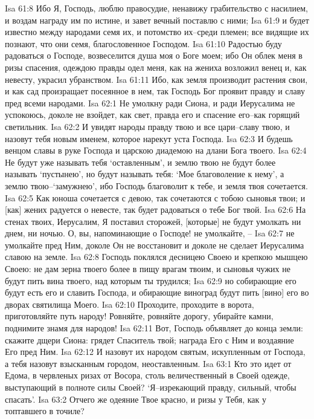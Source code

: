 Isa 61:8  Ибо Я, Господь, люблю правосудие, ненавижу грабительство с насилием, и воздам награду им по истине, и завет вечный поставлю с ними;
Isa 61:9  и будет известно между народами семя их, и потомство их--среди племен; все видящие их познают, что они семя, благословенное Господом.
Isa 61:10  Радостью буду радоваться о Господе, возвеселится душа моя о Боге моем; ибо Он облек меня в ризы спасения, одеждою правды одел меня, как на жениха возложил венец и, как невесту, украсил убранством.
Isa 61:11  Ибо, как земля производит растения свои, и как сад произращает посеянное в нем, так Господь Бог проявит правду и славу пред всеми народами.
Isa 62:1  Не умолкну ради Сиона, и ради Иерусалима не успокоюсь, доколе не взойдет, как свет, правда его и спасение его--как горящий светильник.
Isa 62:2  И увидят народы правду твою и все цари--славу твою, и назовут тебя новым именем, которое нарекут уста Господа.
Isa 62:3  И будешь венцом славы в руке Господа и царскою диадемою на длани Бога твоего.
Isa 62:4  Не будут уже называть тебя `оставленным', и землю твою не будут более называть `пустынею', но будут называть тебя: `Мое благоволение к нему', а землю твою--`замужнею', ибо Господь благоволит к тебе, и земля твоя сочетается.
Isa 62:5  Как юноша сочетается с девою, так сочетаются с тобою сыновья твои; и [как] жених радуется о невесте, так будет радоваться о тебе Бог твой.
Isa 62:6  На стенах твоих, Иерусалим, Я поставил сторожей, [которые] не будут умолкать ни днем, ни ночью. О, вы, напоминающие о Господе! не умолкайте, --
Isa 62:7  не умолкайте пред Ним, доколе Он не восстановит и доколе не сделает Иерусалима славою на земле.
Isa 62:8  Господь поклялся десницею Своею и крепкою мышцею Своею: не дам зерна твоего более в пищу врагам твоим, и сыновья чужих не будут пить вина твоего, над которым ты трудился;
Isa 62:9  но собирающие его будут есть его и славить Господа, и обирающие виноград будут пить [вино] его во дворах святилища Моего.
Isa 62:10  Проходите, проходите в ворота, приготовляйте путь народу! Ровняйте, ровняйте дорогу, убирайте камни, поднимите знамя для народов!
Isa 62:11  Вот, Господь объявляет до конца земли: скажите дщери Сиона: грядет Спаситель твой; награда Его с Ним и воздаяние Его пред Ним.
Isa 62:12  И назовут их народом святым, искупленным от Господа, а тебя назовут взысканным городом, неоставленным.
Isa 63:1  Кто это идет от Едома, в червленых ризах от Восора, столь величественный в Своей одежде, выступающий в полноте силы Своей? `Я--изрекающий правду, сильный, чтобы спасать'.
Isa 63:2  Отчего же одеяние Твое красно, и ризы у Тебя, как у топтавшего в точиле?
